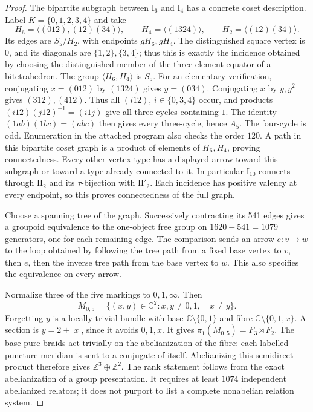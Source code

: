 \begin{proof}
The bipartite subgraph between $\mathrm I_6$ and $\mathrm I_4$
has a concrete coset description.  Label $K=\{0,1,2,3,4\}$ and take
\[
 H_6=\langle(012),(12)(34)\rangle,
 \qquad H_4=\langle(1324)\rangle,
 \qquad H_2=\langle(12)(34)\rangle.
\]
Its edges are $S_5/H_2$, with endpoints $gH_6,gH_4$.
The distinguished square vertex is $0$, and its diagonals are
$\{1,2\},\{3,4\}$; thus this is exactly the incidence obtained by
choosing the distinguished member of the three-element equator
of a bitetrahedron.  The group $\langle H_6,H_4\rangle$ is $S_5$.
For an elementary verification, conjugating $x=(012)$ by
$(1324)$ gives $y=(034)$.  Conjugating $x$ by $y,y^2$ gives
$(312),(412)$.  Thus all $(i12)$, $i\in\{0,3,4\}$ occur,
and products $(i12)(j12)^{-1}=(i1j)$ give all three-cycles
containing $1$.  The identity $(1ab)(1bc)=(abc)$ then gives
every three-cycle, hence $A_5$.  The four-cycle is odd.  Enumeration in the attached program also
checks the order $120$.  A path in this bipartite coset graph is a
product of elements of $H_6,H_4$, proving connectedness.  Every
other vertex type has a displayed arrow toward this subgraph or
toward a type already connected to it.  In particular
$\mathrm I_{10}$ connects through $\mathrm {II}_2$ and its
$\tau$-bijection with $\mathrm {II}'_2$.  Each incidence has
positive valency at every endpoint, so this proves connectedness
of the full graph.

Choose a spanning tree of the graph.  Successively contracting
its 541 edges gives a groupoid equivalence to the one-object free
group on $1620-541=1079$ generators, one for each remaining edge.
The comparison sends an arrow $e:v\to w$ to the loop obtained by
following the tree path from a fixed base vertex to $v$, then $e$,
then the inverse tree path from the base vertex to $w$.  This also
specifies the equivalence on every arrow.

Normalize three of the five markings to $0,1,\infty$.  Then
\[
 M_{0,5}=\{(x,y)\in\mathbb C^2:
 x,y\ne0,1,\quad x\ne y\}.
\]
Forgetting $y$ is a locally trivial bundle with base
$\mathbb C\setminus\{0,1\}$ and fibre
$\mathbb C\setminus\{0,1,x\}$.  A section is
$y=2+|x|$, since it avoids $0,1,x$.  It gives
$\pi_1(M_{0,5})=F_3\rtimes F_2$.  The base pure braids act trivially
on the abelianization of the fibre: each labelled puncture
meridian is sent to a conjugate of itself.  Abelianizing this
semidirect product therefore gives $\mathbb Z^3\oplus\mathbb Z^2$.
The rank statement follows from the exact abelianization of a
group presentation.  It requires at least $1074$ independent
abelianized relators; it does not purport to list a complete
nonabelian relation system.
\end{proof}

